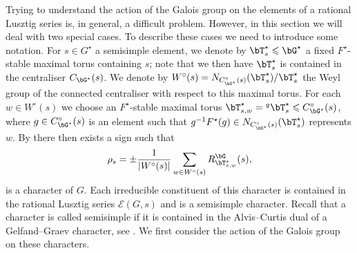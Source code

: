 \documentclass[eqthmnum, nocolour]{jt-calcs}
\begin{document}
\begin{pa}
Trying to understand the action of the Galois group on the elements of a rational Lusztig series is, in general, a difficult problem. However, in this section we will deal with two special cases. To describe these cases we need to introduce some notation. For $s \in G^{\star}$ a semisimple element, we denote by $\bT_s^{\star} \leqslant \bG^{\star}$ a fixed $F^{\star}$-stable maximal torus containing $s$; note that we then have $\bT_s^{\star}$ is contained in the centraliser $C_{\bG^{\star}}(s)$. We denote by $W^{\circ}(s) = N_{C_{\bG^{\star}}^{\circ}(s)}(\bT_s^{\star})/\bT_s^{\star}$ the Weyl group of the connected centraliser with respect to this maximal torus. For each $w \in W^{\circ}(s)$ we choose an $F^{\star}$-stable maximal torus $\bT_{s,w}^{\star} = {}^g\bT_s^{\star} \leqslant C_{\bG^{\star}}^{\circ}(s)$, where $g \in C_{\bG^{\star}}^{\circ}(s)$ is an element such that $g^{-1}F^{\star}(g) \in N_{C_{\bG^{\star}}^{\circ}(s)}(\bT_s^{\star})$ represents $w$. By \cite[15.11]{bonnafe:2006:sln} there then exists a sign such that
\begin{equation*}
\rho_s = \pm\frac{1}{|W^{\circ}(s)|}\sum_{w \in W^{\circ}(s)} R_{\bT_{s,w}^{\star}}^{\bG}(s),
\end{equation*}
is a character of $G$. Each irreducible constituent of this character is contained in the rational Lusztig series $\mathcal{E}(G,s)$ and is a semisimple character. Recall that a character is called semisimple if it is contained in the Alvis--Curtis dual of a Gelfand--Graev character, see \cite[8.8, 14.39]{digne-michel:1991:representations-of-finite-groups-of-lie-type}. We first consider the action of the Galois group on these characters.
\end{pa}
\end{document}
